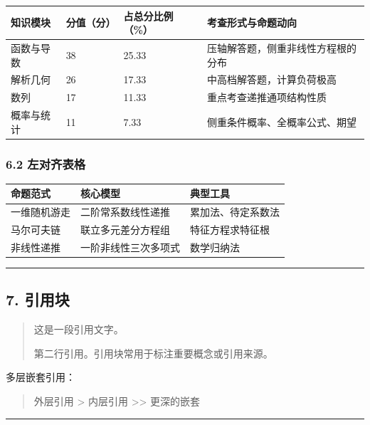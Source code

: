 \documentclass[]{article}
\begin{document}
\begin{longtable}[]{@{}llll@{}}
\toprule\noalign{}
知识模块 & 分值（分） & 占总分比例（\%） & 考查形式与命题动向 \\
\midrule\noalign{}
\endhead
\bottomrule\noalign{}
\endlastfoot
函数与导数 & 38 & 25.33 & 压轴解答题，侧重非线性方程根的分布 \\
解析几何 & 26 & 17.33 & 中高档解答题，计算负荷极高 \\
数列 & 17 & 11.33 & 重点考查递推通项结构性质 \\
概率与统计 & 11 & 7.33 & 侧重条件概率、全概率公式、期望 \\
\end{longtable}

\subsubsection{6.2 左对齐表格}\label{ux5de6ux5bf9ux9f50ux8868ux683c}

\begin{longtable}[]{@{}lll@{}}
\toprule\noalign{}
命题范式 & 核心模型 & 典型工具 \\
\midrule\noalign{}
\endhead
\bottomrule\noalign{}
\endlastfoot
一维随机游走 & 二阶常系数线性递推 & 累加法、待定系数法 \\
马尔可夫链 & 联立多元差分方程组 & 特征方程求特征根 \\
非线性递推 & 一阶非线性三次多项式 & 数学归纳法 \\
\end{longtable}

\begin{center}\rule{0.5\linewidth}{0.5pt}\end{center}

\subsection{7. 引用块}\label{ux5f15ux7528ux5757}

\begin{quote}
这是一段引用文字。

第二行引用。引用块常用于标注重要概念或引用来源。
\end{quote}

多层嵌套引用：

\begin{quote}
外层引用 \textgreater{} 内层引用 \textgreater\textgreater{} 更深的嵌套
\end{quote}

\begin{center}\rule{0.5\linewidth}{0.5pt}\end{center}
\end{document}
